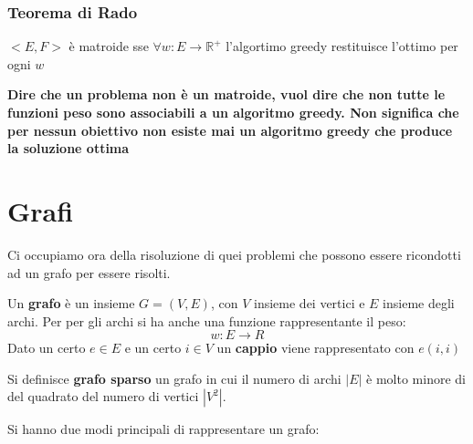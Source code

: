 \documentclass[a4paper,12pt, oneside]{book}
\begin{document}
\subsection{Teorema di Rado}
\begin{teorema}
  $<E,F>$ è matroide sse $\forall w:E\to \mathbb{R}^+$ l'algortimo
  greedy restituisce l'ottimo per ogni $w$
\end{teorema}
\textbf{Dire che un problema non è un matroide, vuol dire
  che non tutte le funzioni peso sono associabili a un algoritmo
  greedy. Non significa che per nessun obiettivo non esiste mai un
  algoritmo greedy che produce la soluzione ottima}
\chapter{Grafi}
Ci occupiamo ora della risoluzione di quei problemi che possono essere
ricondotti ad un grafo per essere risolti.
\begin{definizione}
  Un \textbf{grafo} è un insieme $G=(V,E)$, con $V$ insieme dei vertici
  e $E$ insieme degli archi. Per per gli archi si ha anche una funzione
  rappresentante il peso:
  \[w:E\to\mathit{R}\]
  Dato un certo $e\in E$ e un certo $i\in V$ un \textbf{cappio} viene
  rappresentato con $e(i,i)$
\end{definizione}
\begin{definizione}
  Si definisce \textbf{grafo sparso} un grafo in cui il numero di
  archi $|E|$ è molto minore di del quadrato del numero di vertici
  $|V^2|$. 
\end{definizione}
Si hanno due modi principali di rappresentare un grafo:
\end{document}
